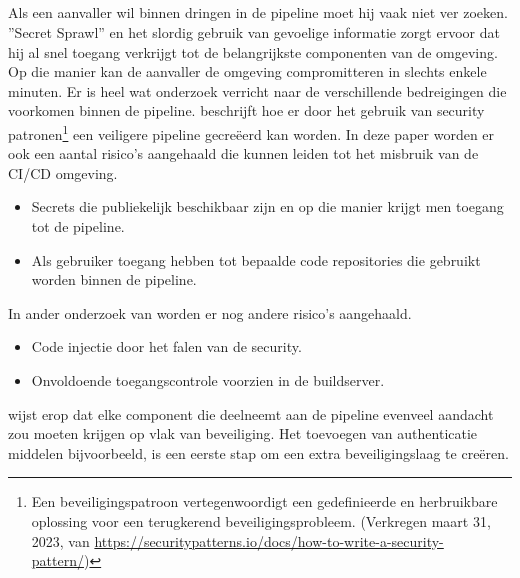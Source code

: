 \subsection{}
\label{sec:Bedreigingen in de pipeline}
Als een aanvaller wil binnen dringen in de pipeline moet hij vaak niet ver zoeken. ''Secret Sprawl'' en het slordig gebruik van gevoelige informatie zorgt ervoor dat hij al snel toegang verkrijgt tot de belangrijkste componenten van de omgeving. Op die manier kan de aanvaller de omgeving compromitteren in slechts enkele minuten. \autocite{Smart2022} Er is heel wat onderzoek verricht naar de verschillende bedreigingen die voorkomen binnen de pipeline. \textcite{Rimba2015} beschrijft hoe er door het gebruik van security patronen\footnote{Een beveiligingspatroon vertegenwoordigt een gedefinieerde en herbruikbare oplossing voor een terugkerend beveiligingsprobleem. (Verkregen maart 31, 2023, van \url{https://securitypatterns.io/docs/how-to-write-a-security-pattern/})} een veiligere pipeline gecreëerd kan worden. In deze paper worden er ook een aantal risico’s aangehaald die kunnen leiden tot het misbruik van de CI/CD omgeving.
 
\begin{itemize}
  \item Secrets die publiekelijk beschikbaar zijn en op die manier krijgt men toegang tot de pipeline.
  \item Als gebruiker toegang hebben tot bepaalde code repositories die gebruikt worden binnen de pipeline.
\end{itemize}

In ander onderzoek van \textcite{Ullah2017} worden er nog andere risico's aangehaald.

\begin{itemize}
  \item Code injectie door het falen van de security.
  \item Onvoldoende toegangscontrole voorzien in de buildserver.
\end{itemize}

\textcite{Ullah2017} wijst erop dat elke component die deelneemt aan de pipeline evenveel aandacht zou moeten krijgen op vlak van beveiliging. Het toevoegen van authenticatie middelen bijvoorbeeld, is een eerste stap om een extra beveiligingslaag te creëren.
\newline

